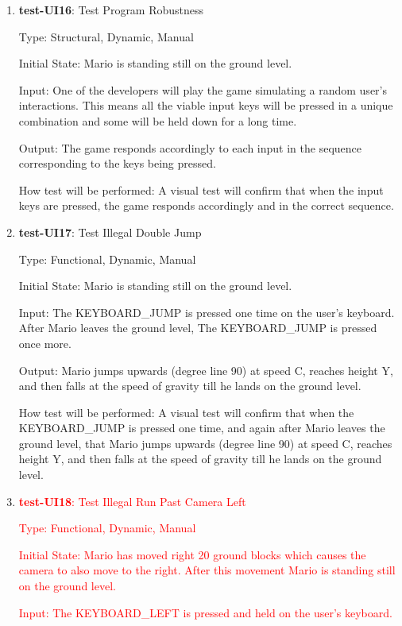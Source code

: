 \documentclass[12pt, titlepage]{article}
\begin{document}
\begin{enumerate}
\item{\textbf{test-UI16}: Test Program Robustness\\}

Type: Structural, Dynamic, Manual

Initial State: Mario is standing still on the ground level.

Input: One of the developers will play the game simulating a random user's interactions. This means all the viable input keys will be pressed in a unique combination and some will be held down for a long time.

Output: The game responds accordingly to each input in the sequence corresponding to the keys being pressed.

How test will be performed: A visual test will confirm that when the input keys are pressed, the game responds accordingly and in the correct sequence.

\item{\textbf{test-UI17}: Test Illegal Double Jump\\}

Type: Functional, Dynamic, Manual

Initial State: Mario is standing still on the ground level.

Input: The KEYBOARD\_JUMP is pressed one time on the user's keyboard. After Mario leaves the ground level, The KEYBOARD\_JUMP is pressed once more.

Output: Mario jumps upwards (degree line 90) at speed C, reaches height Y, and then falls at the speed of gravity till he lands on the ground level.

How test will be performed: A visual test will confirm that when the KEYBOARD\_JUMP is pressed one time, and again after Mario leaves the ground level, that Mario jumps upwards (degree line 90) at speed C, reaches height Y, and then falls at the speed of gravity till he lands on the ground level.

\item{\textcolor{red}{\textbf{test-UI18}}\textcolor{red}{: Test Illegal Run Past Camera Left\\}}

\textcolor{red}{Type: Functional, Dynamic, Manual}

\textcolor{red}{Initial State: Mario has moved right 20 ground blocks which causes the camera to also move to the right. After this movement Mario is standing still on the ground level.}

\textcolor{red}{Input: The KEYBOARD\_LEFT is pressed and held on the user's keyboard.}


\end{enumerate}
\end{document}
